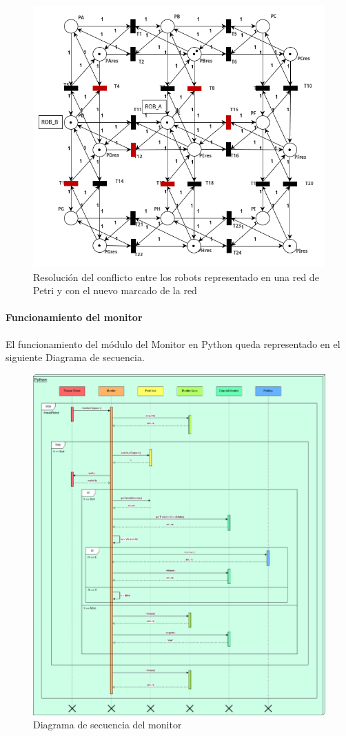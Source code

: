 \begin{figure}[H]
    \centering
    \includegraphics[width=0.7\linewidth]{images/rdp_no_grid_conflicto_solucionado.png}
    \caption{Resolución del conflicto entre los robots representado en una red de Petri y con el nuevo marcado de la red}
    \label{fig:rdp_no_grid_conflicto_solucionado}
\end{figure}

\paragraph{Funcionamiento del monitor} \mbox{} \vspace{10pt}

El funcionamiento del módulo del Monitor en Python queda representado en el siguiente Diagrama de secuencia.

\begin{figure}[H]
    \centering
    \includegraphics[width=1.0\linewidth]{images/diagrama_monitor.drawio.png}
    \caption{Diagrama de secuencia del monitor}
    \label{fig:diagrama_monitor}
\end{figure}